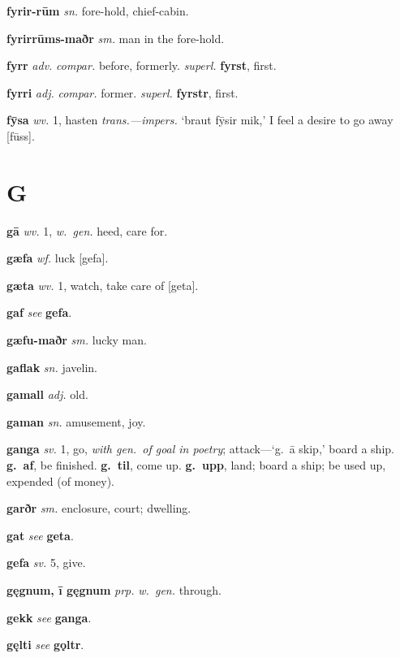 \documentclass[12pt,letterpaper]{book}
\newcommand\emptypage{\clearpage{\pagestyle{empty}\cleardoublepage}}
\begin{document}
\noindent
\textbf{fyrir-rūm} \textit{sn.} fore-hold, chief-cabin.

\noindent
\textbf{fyrirrūms-maðr} \textit{sm.} man in the fore-hold.

\noindent
\textbf{fyrr} \textit{adv.} \textit{compar.} before, formerly.  \textit{superl.}
	\textbf{fyrst}, first.

\noindent
\textbf{fyrri} \textit{adj.} \textit{compar.} former.  \textit{superl.}
	\textbf{fyrstr}, first.

\noindent
\textbf{fȳsa} \textit{wv.} 1, hasten \textit{trans.---impers.} `braut fȳsir
	mik,' I feel a desire to go away [fūss].

\emptypage

\chapter*{G}

\noindent
\textbf{gā} \textit{wv.} 1, \textit{w.\ gen.} heed, care for.

\noindent
\textbf{gæfa} \textit{wf.} luck [gefa].

\noindent
\textbf{gæta} \textit{wv.} 1, watch, take care of [geta].

\noindent
\textbf{gaf} \textit{} \textit{see} \textbf{gefa}.

\noindent
\textbf{gæfu-maðr} \textit{sm.} lucky man.

\noindent
\textbf{gaflak} \textit{sn.} javelin.

\noindent
\textbf{gamall} \textit{adj.} old.

\noindent
\textbf{gaman} \textit{sn.} amusement, joy.

\noindent
\textbf{ganga} \textit{sv.} 1, go, \textit{with gen.\ of goal in poetry};
	attack---`g.\ ā skip,' board a ship.  \textbf{g.\ af}, be finished.
	\textbf{g.\ til}, come up.  \textbf{g.\ upp}, land; board a ship; be
	used up, expended (of money).

\noindent
\textbf{garðr} \textit{sm.} enclosure, court; dwelling.

\noindent
\textbf{gat} \textit{} \textit{see} \textbf{geta}.

\noindent
\textbf{gefa} \textit{sv.} 5, give.

\noindent
\textbf{gęgnum, ī gęgnum} \textit{prp.} \textit{w.\ gen.} through.

\noindent
\textbf{gekk} \textit{} \textit{see} \textbf{ganga}.

\noindent
\textbf{gęlti} \textit{} \textit{see} \textbf{gǫltr}.
\end{document}
